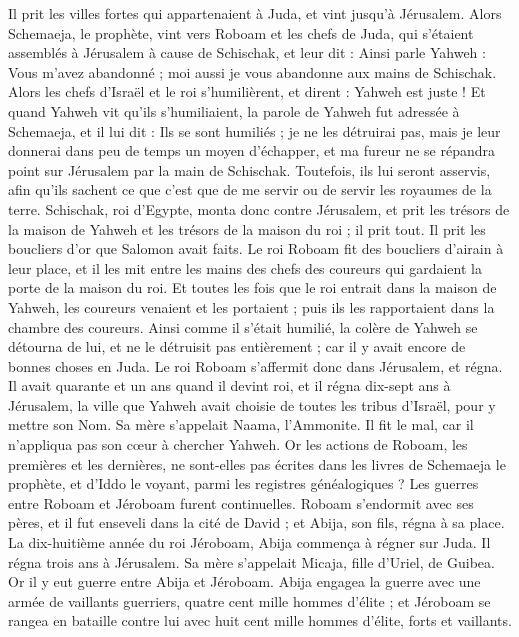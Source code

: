 \begin{multicols}{2}
Il prit les villes fortes qui appartenaient à Juda, et vint jusqu'à Jérusalem.
Alors Schemaeja, le prophète, vint vers Roboam et les chefs de Juda, qui s'étaient assemblés à Jérusalem à cause de Schischak, et leur dit : Ainsi parle Yahweh : Vous m'avez abandonné ; moi aussi je vous abandonne aux mains de Schischak.
Alors les chefs d'Israël et le roi s'humilièrent, et dirent : Yahweh est juste !
Et quand Yahweh vit qu'ils s'humiliaient, la parole de Yahweh fut adressée à Schemaeja, et il lui dit : Ils se sont humiliés ; je ne les détruirai pas, mais je leur donnerai dans peu de temps un moyen d'échapper, et ma fureur ne se répandra point sur Jérusalem par la main de Schischak.
Toutefois, ils lui seront asservis, afin qu'ils sachent ce que c'est que de me servir ou de servir les royaumes de la terre.
Schischak, roi d'Egypte, monta donc contre Jérusalem, et prit les trésors de la maison de Yahweh et les trésors de la maison du roi ; il prit tout. Il prit les boucliers d'or que Salomon avait faits.
Le roi Roboam fit des boucliers d'airain à leur place, et il les mit entre les mains des chefs des coureurs qui gardaient la porte de la maison du roi.
Et toutes les fois que le roi entrait dans la maison de Yahweh, les coureurs venaient et les portaient ; puis ils les rapportaient dans la chambre des coureurs.
Ainsi comme il s'était humilié, la colère de Yahweh se détourna de lui, et ne le détruisit pas entièrement ; car il y avait encore de bonnes choses en Juda.
Le roi Roboam s'affermit donc dans Jérusalem, et régna. Il avait quarante et un ans quand il devint roi, et il régna dix-sept ans à Jérusalem, la ville que Yahweh avait choisie de toutes les tribus d'Israël, pour y mettre son Nom. Sa mère s'appelait Naama, l'Ammonite.
Il fit le mal, car il n'appliqua pas son cœur à chercher Yahweh.
Or les actions de Roboam, les premières et les dernières, ne sont-elles pas écrites dans les livres de Schemaeja le prophète, et d'Iddo le voyant, parmi les registres généalogiques ? Les guerres entre Roboam et Jéroboam furent continuelles.
Roboam s'endormit avec ses pères, et il fut enseveli dans la cité de David ; et Abija, son fils, régna à sa place.
\VerseOne{}La dix-huitième année du roi Jéroboam, Abija commença à régner sur Juda.
Il régna trois ans à Jérusalem. Sa mère s'appelait Micaja, fille d'Uriel, de Guibea. Or il y eut guerre entre Abija et Jéroboam.
Abija engagea la guerre avec une armée de vaillants guerriers, quatre cent mille hommes d'élite ; et Jéroboam se rangea en bataille contre lui avec huit cent mille hommes d'élite, forts et vaillants.

\end{multicols}
